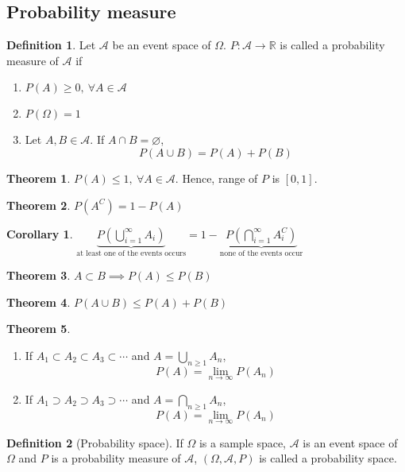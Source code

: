 \documentclass[10pt, a4paper]{extarticle}
\theoremstyle{definition}
\newtheorem{thm}{Theorem}
\newtheorem{cor}{Corollary}[thm]
\newtheorem{defn}{Definition}
\begin{document}
	\subsection{Probability measure}
	\begin{defn}
		Let $\mathscr{A}$ be an event space of $\Omega$. $P:\mathscr{A}\to \mathbb{R}$ is called a probability measure of $\mathscr{A}$ if
		\begin{enumerate}
			\item $P(A)\geq 0,\ \forall A\in\mathscr{A}$
			\item $P(\Omega)=1$
			\item Let $A,B\in\mathscr{A}$. If $A\cap B =\varnothing$,
				\[P(A\cup B)=P(A)+P(B)\]
	\end{enumerate}
	\end{defn}
	\begin{thm}
		$P(A)\leq 1,\ \forall A\in\mathscr{A}$. Hence, range of $P$ is $[0,1]$.
	\end{thm}
	\begin{thm}
		$P(A^C)=1-P(A)$
	\end{thm}
		\begin{cor}
			$\underbrace{P\left(\bigcup\limits_{i=1}^\infty A_i\right)}_{\text{at least one of the events occurs}}=1-\underbrace{P\left(\bigcap\limits_{i=1}^\infty A_i^C\right)}_{\text{none of the events occur}}$
		\end{cor}
	\begin{thm}
		$A\subset B\implies P(A)\leq P(B)$
	\end{thm}
	\begin{thm}
		$P(A\cup B)\leq P(A)+P(B)$
	\end{thm}
	
	\begin{thm}
		\hfill
		\begin{enumerate}
			\item If $A_1\subset A_2\subset A_3\subset\cdots$ and $A=\bigcup\limits_{n\geq 1} A_n$,
				\[P(A)=\lim\limits_{n\to\infty}P(A_n)\]
			\item If $A_1\supset A_2\supset A_3\supset\cdots$ and $A=\bigcap\limits_{n\geq 1} A_n$,
				\[P(A)=\lim\limits_{n\to\infty}P(A_n)\]
	\end{enumerate}
	\end{thm}
	\begin{defn}[Probability space]
		If $\Omega$ is a sample space, $\mathscr{A}$ is an event space of $\Omega$ and $P$ is a probability measure of $\mathscr{A}$, $(\Omega, \mathscr{A}, P)$ is called a probability space.
	\end{defn}
\end{document}
